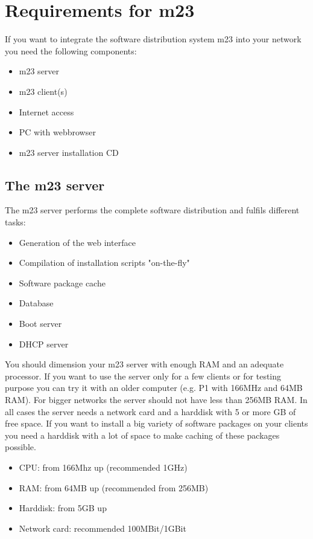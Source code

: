 \chapter{Requirements for m23}
If you want to integrate the software distribution system m23 into your network you need the following components:
\begin{itemize}
\item m23 server
\item m23 client(s)
\item Internet access
\item PC with webbrowser
\item m23 server installation CD
\end{itemize}

\section{The m23 server}
The m23 server performs the complete software distribution and fulfils different tasks:
\begin{itemize}
\item Generation of the web interface
\item Compilation of installation scripts "on-the-fly"
\item Software package cache
\item Database
\item Boot server
\item DHCP server
\end{itemize}
You should dimension your m23 server with enough RAM and an adequate processor. If you want to use the server only for a few clients or for testing purpose you can try it with an older computer (e.g. P1 with 166MHz and 64MB RAM). For bigger networks the server should not have less than 256MB RAM. In all cases the server needs a network card and a harddisk with 5 or more GB of free space. If you want to install a big variety of software packages on your clients you need a harddisk with a lot of space to make caching of these packages possible.
\begin{itemize}
\item CPU: from 166Mhz up (recommended  1GHz)
\item RAM: from 64MB up (recommended  from 256MB)
\item Harddisk: from 5GB up
\item Network card: recommended 100MBit/1GBit
\end{itemize}

